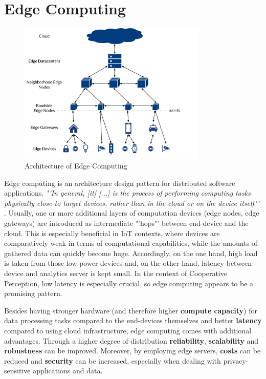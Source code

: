 \section{Edge Computing}
\label{sec:background:edge_computing}

\begin{figure}
	\centering
	\includegraphics[width=0.8\textwidth]{98_images/edge.png}
	\caption{Architecture of Edge Computing \cite{Bischoff2019}}
	\label{fig:edge_computing}
\end{figure}

Edge computing is an architecture design pattern for distributed software applications. \textit{"'In general, [it] [...] is the process of performing computing tasks physically close to target devices, rather than in the cloud or on the device itself"'} \cite{Bischoff2019}. Usually, one or more additional layers of computation devices (edge nodes, edge gateways) are introduced as intermediate "'hops"' between end-device and the cloud. This is especially beneficial in IoT contexts, where devices are comparatively weak in terms of computational capabilities, while the amounts of gathered data can quickly become huge. Accordingly, on the one hand, high load is taken from those low-power devices and, on the other hand, latency between device and analytics server is kept small. In the context of Cooperative Perception, low latency is especially crucial, so edge computing appears to be a promising pattern.

Besides having stronger hardware (and therefore higher \textbf{compute capacity}) for data processing tasks compared to the end-devices themselves and better \textbf{latency} compared to using cloud infrastructure, edge computing comes with additional advantages. Through a higher degree of distribution \textbf{reliability}, \textbf{scalability} and \textbf{robustness} can be improved. Moreover, by employing edge servers, \textbf{costs} can be reduced and \textbf{security} can be increased, especially when dealing with privacy-sensitive applications and data. 

